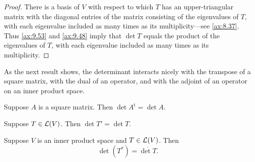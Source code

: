 \begin{proof}
There is a basis of $V$ with respect to which $T$ has an upper-triangular
matrix with the diagonal entries of the matrix consisting of the eigenvalues of
$T$, with each eigenvalue included as many times as its multiplicity---see
\ref{ax:8.37}. Thus \ref{ax:9.53} and \ref{ax:9.48} imply that $\det T$ equals
the product of the eigenvalues of $T$, with each eigenvalue included as many
times as its multiplicity.
\end{proof}

As the next result shows, the determinant interacts nicely with the transpose
of a square matrix, with the dual of an operator, and with the adjoint of an
operator on an inner product space.

\begin{result}\label{ax:9.56}\leavevmode
\begin{parts}
\item Suppose $A$ is a square matrix. Then $\det A^{\mathrm{t}}=\det A$.
\item Suppose $T\in\mathcal{L}(V)$. Then $\det T'=\det T$.
\item Suppose $V$ is an inner product space and $T\in\mathcal{L}(V)$. Then
  \[ \det(T^*) = \overline{\det T}. \]
\end{parts}
\end{result}

